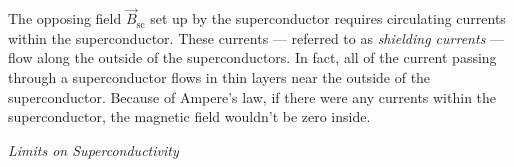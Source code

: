 The opposing field $\vec B_\text{sc}$ set up by the superconductor
requires circulating currents within the superconductor.  These
currents --- referred to as {\em shielding currents} --- flow along
the outside of the superconductors.  In fact, all of the current
passing through a superconductor flows in thin layers near the outside
of the superconductor.  Because of Ampere's law, if there were any
currents within the superconductor, the magnetic field wouldn't be
zero inside.

\bigskip
\noindent\textit{Limits on Superconductivity}
\medskip

%

%


